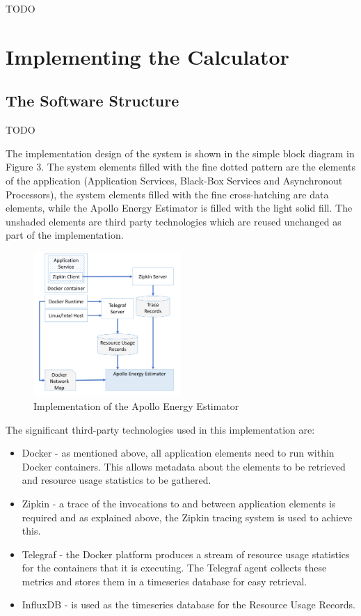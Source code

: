 TODO

\section{Implementing the Calculator}

\subsection{The Software Structure}

TODO

The implementation design of the system is shown in the simple block diagram in Figure 3. The system elements filled with the fine dotted pattern are the elements of the application (Application Services, Black-Box Services and Asynchronout Processors), the system elements filled with the fine cross-hatching are data elements, while the Apollo Energy Estimator is filled with the light solid fill.  The unshaded elements are third party technologies which are reused unchanged as part of the implementation.

\begin{figure}
\centering
\includegraphics[width=0.5\textwidth]{Figures/implementation-design}
\caption{Implementation of the Apollo Energy Estimator}
\label{figure:implementation}
\end{figure}

The significant third-party technologies used in this implementation are:
\begin{itemize}
\item Docker - as mentioned above, all application elements need to run within Docker containers.  This allows metadata about the elements to be retrieved and resource usage statistics to be gathered.
\item Zipkin - a trace of the invocations to and between application elements is required and as explained above, the Zipkin tracing system is used to achieve this.
\item Telegraf - the Docker platform produces a stream of resource usage statistics for the containers that it is executing.  The Telegraf agent collects these metrics and stores them in a timeseries database for easy retrieval.
\item InfluxDB - is used as the timeseries database for the Resource Usage Records.
\end{itemize}


